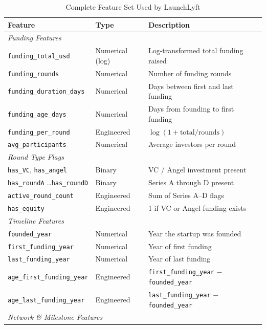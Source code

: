 \documentclass[12pt,a4paper]{article}
\begin{document}
\begin{table}[H]
\centering
\caption{Complete Feature Set Used by LaunchLyft}
\label{tab:features}
\begin{tabular}{llp{5.5cm}}
\toprule
\textbf{Feature} & \textbf{Type} & \textbf{Description} \\
\midrule
\multicolumn{3}{l}{\textit{Funding Features}} \\
\texttt{funding\_total\_usd}     & Numerical (log) & Log-transformed total funding raised \\
\texttt{funding\_rounds}         & Numerical       & Number of funding rounds \\
\texttt{funding\_duration\_days} & Numerical       & Days between first and last funding \\
\texttt{funding\_age\_days}      & Numerical       & Days from founding to first funding \\
\texttt{funding\_per\_round}     & Engineered      & $\log(1 + \text{total} / \text{rounds})$ \\
\texttt{avg\_participants}       & Numerical       & Average investors per round \\
\midrule
\multicolumn{3}{l}{\textit{Round Type Flags}} \\
\texttt{has\_VC}, \texttt{has\_angel} & Binary & VC / Angel investment present \\
\texttt{has\_roundA} \ldots \texttt{has\_roundD} & Binary & Series A through D present \\
\texttt{active\_round\_count}    & Engineered      & Sum of Series A--D flags \\
\texttt{has\_equity}             & Engineered      & 1 if VC or Angel funding exists \\
\midrule
\multicolumn{3}{l}{\textit{Timeline Features}} \\
\texttt{founded\_year}           & Numerical       & Year the startup was founded \\
\texttt{first\_funding\_year}    & Numerical       & Year of first funding \\
\texttt{last\_funding\_year}     & Numerical       & Year of last funding \\
\texttt{age\_first\_funding\_year} & Engineered    & \texttt{first\_funding\_year} $-$ \texttt{founded\_year} \\
\texttt{age\_last\_funding\_year}  & Engineered    & \texttt{last\_funding\_year} $-$ \texttt{founded\_year} \\
\midrule
\multicolumn{3}{l}{\textit{Network \& Milestone Features}} \\

\end{tabular}
\end{table}
\end{document}
